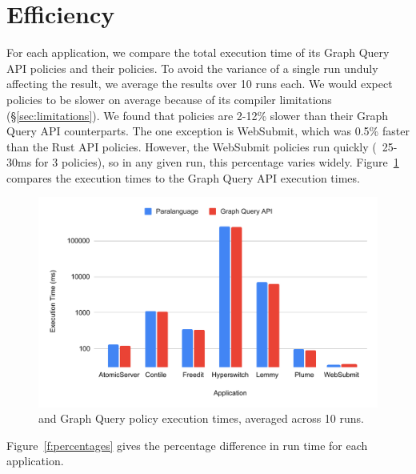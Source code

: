 \section{Efficiency}
\label{sec:efficiency}
For each application, we compare the total execution time of its Graph Query API policies
and their \syslang{} policies.
%
To avoid the variance of a single run unduly affecting the result, we average the results over 10 runs each.
%
We would expect \syslang{} policies to be slower on average because of its compiler limitations (\S\ref{sec:limitations}).
%
We found that \syslang{} policies are 2-12\% slower than their Graph Query API counterparts.
%
The one exception is WebSubmit, which was 0.5\% faster than the Rust API policies.
%
However, the WebSubmit policies run quickly (~25-30ms for 3 policies),
so in any given run, this percentage varies widely.
%
Figure~\ref{f:times} compares the \syslang{} execution times to the Graph Query API execution times.
%
\begin{figure}
    \begin{centering}
        \includegraphics[scale=0.7]{graphics/times.pdf}
        \caption{\syslang{} and Graph Query policy execution times, averaged across 10 runs.}
        \label{f:times}
    \end{centering}
\end{figure}
%
Figure~\ref{f:percentages} gives the percentage difference in run time for each application.
